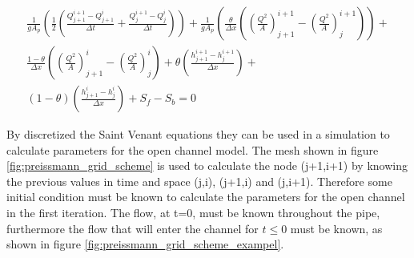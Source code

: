 \begin{multline}
	\frac{1}{gA_p}\left(\frac{1}{2} \left(\frac{Q_{j+1}^{i+1}-Q_{j+1}^i}{\Delta t}+\frac{Q_{j}^{i+1} - Q_j^i}{\Delta t}\right)\right) + \frac{1}{gA_p}\left(\frac{\theta}{\Delta x} \left(\left(\frac{Q^2}{A}\right)_{j+1}^{i+1}-\left(\frac{Q^2}{A}\right)_{j}^{i+1}\right)\right) + \\ \frac{1-\theta}{\Delta x}\left(\left(\frac{Q^2}{A}\right)_{j+1}^{i}-\left(\frac{Q^2}{A}\right)_{j}^{i}\right)+\theta \left(\frac{h_{j+1}^{i+1}-h_j^{i+1}}{\Delta x}\right)+ \\ (1-\theta)\left(\frac{h_{j+1}^{i} - h_j^i}{\Delta x}\right)+S_f-S_b= 0 
\end{multline}

By discretized the Saint Venant equations they can be used in a simulation to calculate parameters for the open channel model. The mesh shown in figure \ref{fig:preissmann_grid_scheme} is used to calculate the node (j+1,i+1) by knowing the previous values in time and space (j,i), (j+1,i) and (j,i+1). Therefore some initial condition must be known to calculate the parameters for the open channel in the first iteration. The flow, at t=0, must be known throughout the pipe, furthermore the flow that will enter the channel for $t\leq 0$ must be known, as shown in figure \ref{fig:preissmann_grid_scheme_exampel}.   

